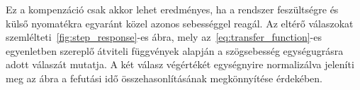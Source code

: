 


Ez a kompenzáció
csak akkor lehet eredményes, ha a rendszer feszültségre és külső nyomatékra 
egyaránt közel azonos sebességgel reagál.
Az eltérő válaszokat szemlélteti~\ref{fig:step_response}-es ábra, mely az~\eqref{eq:transfer_function}-es
egyenletben szereplő átviteli függvények alapján a szögsebesség egységugrásra adott válaszát mutatja. 
A két válasz végértékét egységnyire normalizálva jeleníti meg az ábra a fefutási idő 
összehasonlításának megkönnyítése érdekében. 



